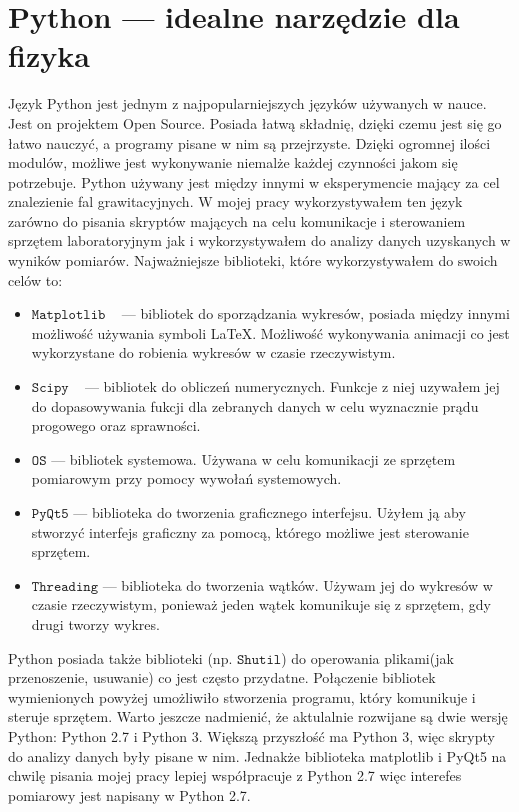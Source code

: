 \section{Python --- idealne narzędzie dla fizyka}
Język Python jest jednym z najpopularniejszych języków używanych w nauce. Jest on projektem Open Source. Posiada łatwą składnię, dzięki czemu jest się go łatwo nauczyć, a programy pisane w nim są przejrzyste. Dzięki ogromnej ilości modulów, możliwe jest wykonywanie niemalże każdej czynności jakom się potrzebuje. Python używany jest między innymi w eksperymencie mający za cel znalezienie fal grawitacyjnych. W mojej pracy wykorzystywałem ten język zarówno do pisania skryptów mających na celu komunikacje i sterowaniem sprzętem laboratoryjnym jak i  wykorzystywałem do analizy danych uzyskanych w wyników pomiarów.
Najważniejsze biblioteki, które wykorzystywałem do swoich celów to:
\begin{itemize}
\item $\mathtt{Matplotlib}$ ~\cite{matplotlib_book} --- bibliotek do sporządzania wykresów, posiada między innymi możliwość używania symboli \LaTeX.
 Możliwość wykonywania animacji co jest wykorzystane do robienia wykresów w czasie rzeczywistym.
\item $\mathtt{Scipy}$ ~\cite{SciPy_book} --- bibliotek do obliczeń numerycznych. Funkcje z niej uzywałem jej do dopasowywania
fukcji dla zebranych danych w celu wyznacznie prądu progowego oraz sprawności.
\item $\mathtt{OS}$ --- bibliotek systemowa. Używana w celu komunikacji ze sprzętem pomiarowym przy pomocy wywołań systemowych.
\item $\mathtt{PyQt5}$ --- biblioteka do tworzenia graficznego interfejsu. Użyłem ją aby stworzyć interfejs graficzny za pomocą,
którego możliwe jest sterowanie sprzętem.
\item $\mathtt{Threading}$ --- biblioteka do tworzenia wątków. Używam jej do wykresów w czasie rzeczywistym, ponieważ
jeden wątek komunikuje się z sprzętem, gdy drugi tworzy wykres.
\end{itemize}
Python posiada także biblioteki (np. $\mathtt{Shutil}$) do operowania plikami(jak przenoszenie, usuwanie) co jest często przydatne.
 Połączenie bibliotek wymienionych powyżej umożliwiło stworzenia programu, który komunikuje i steruje sprzętem.
  Warto jeszcze nadmienić, że aktulalnie rozwijane są dwie wersję Python: Python 2.7 i Python 3. Większą przyszłość ma Python 3,
  więc skrypty do analizy danych były pisane w nim. Jednakże biblioteka matplotlib i PyQt5 na chwilę pisania mojej
  pracy lepiej współpracuje z Python 2.7 więc interefes pomiarowy jest napisany w Python 2.7.
